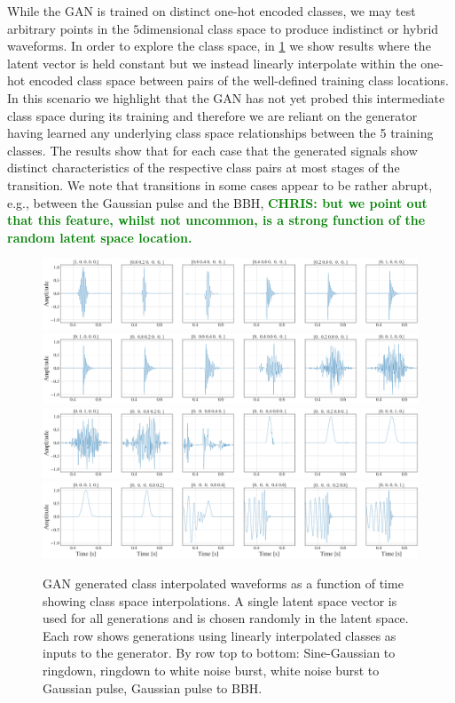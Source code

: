 \documentclass[12pt]{iopart}
\newcommand{\chris}[1]{\textbf{\textcolor{green}{CHRIS: #1}}}
\newcommand{\ndimensional}[1]{$#1$\nobreakdash\discretionary{-}{-}{-}dimensional}
\begin{document}
While the \ac{GAN} is trained on distinct one-hot encoded classes, we may test arbitrary points in the \ndimensional{5} class space to produce indistinct or hybrid waveforms. In order to explore the class space, in \cref{fig:c_interp} we show results where the latent vector is held constant but we instead linearly
interpolate within the one-hot encoded class space between pairs of the well-defined training class locations. In this scenario we highlight that the \ac{GAN} has not yet probed this intermediate class space during its training and therefore we are reliant on the generator having learned any underlying class space relationships between the 5 training classes. The results show that for each case that the generated signals show distinct characteristics of the respective class pairs at most stages of the transition. We note that transitions in some cases appear to be rather abrupt, e.g., between the Gaussian pulse and the \ac{BBH}, \chris{but we point out that this feature, whilst not uncommon, is a strong function of the random latent space location.} 
%
\begin{figure}[!h]
    \centering
    \includegraphics[width=\textwidth]{figures/generations/sg-rd.png}
    \includegraphics[width=\textwidth]{figures/generations/rd-wnb.png}
    \includegraphics[width=\textwidth]{figures/generations/wnb-blip.png}
    \includegraphics[width=\textwidth]{figures/generations/blip-bbh.png}
    \caption{\ac{GAN} generated class interpolated waveforms as a function of time showing class space interpolations. A single latent space vector is used for all generations and is chosen randomly in the latent space. Each row shows generations using linearly interpolated classes as inputs to the generator. By row top to bottom: Sine-Gaussian to ringdown, ringdown to white noise burst, white noise burst to Gaussian pulse, Gaussian pulse to BBH.}
    \label{fig:c_interp}
\end{figure}
%
\end{document}
